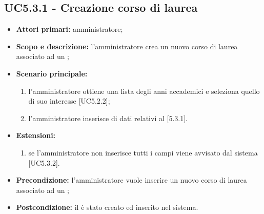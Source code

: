 \documentclass[AnalisiDeiRequisiti.tex]{subfiles}
\begin{document}
\subsection{UC5.3.1 - Creazione corso di laurea}
\begin{itemize}
	\item \textbf{Attori primari:} amministratore;
	\item \textbf{Scopo e descrizione:} l'amministratore crea un nuovo corso di laurea associato ad un ;
	\item \textbf{Scenario principale:}
		\begin{enumerate}
			\item l'amministratore ottiene una lista degli anni accademici e seleziona quello di suo interesse [UC5.2.2];
			\item l'amministratore inserisce di dati relativi al  [5.3.1].
		\end{enumerate}
	\item \textbf{Estensioni:}
		\begin{enumerate}
			\item se l'amministratore non inserisce tutti i campi viene avvisato dal sistema [UC5.3.2].
		\end{enumerate}
	\item \textbf{Precondizione:} l'amministratore vuole inserire un nuovo corso di laurea associato ad un ; 
	\item \textbf{Postcondizione:} il  è stato creato ed inserito nel sistema.
\end{itemize}
\end{document}
